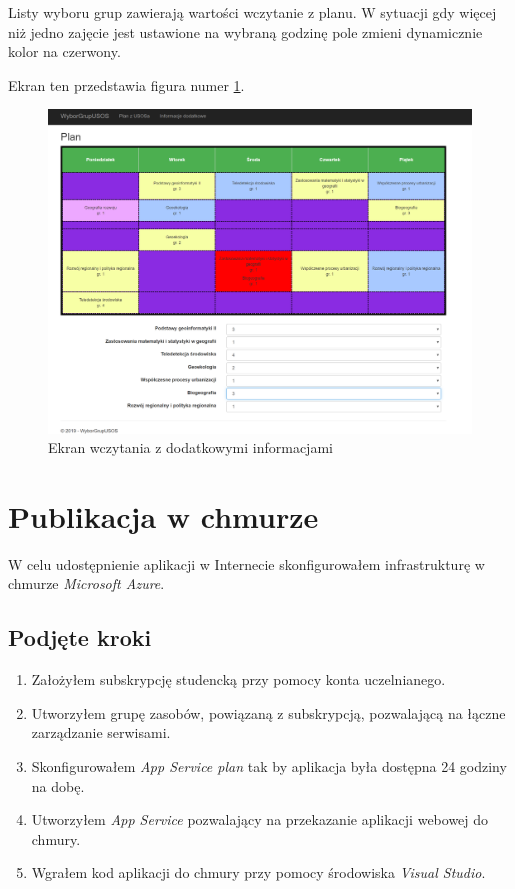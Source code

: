 \documentclass{mwart}
\begin{document}
Listy wyboru grup zawierają wartości wczytanie z planu. W sytuacji gdy więcej niż jedno zajęcie jest ustawione na wybraną godzinę pole zmieni dynamicznie kolor na czerwony.

Ekran ten przedstawia figura numer \ref{fig:ekranPlanu1}.

\begin{figure}[h]
    \centering
    \includegraphics[width=13cm]{Wczytany_plan1.png}
    \caption{Ekran wczytania z dodatkowymi informacjami}
    \label{fig:ekranPlanu1}
\end{figure}


\section{Publikacja w chmurze} \label{sec:chmura}
W celu udostępnienie aplikacji w Internecie skonfigurowałem infrastrukturę w chmurze \textit{Microsoft Azure}.

\subsection{Podjęte kroki}
\begin{enumerate}
\item Założyłem subskrypcję studencką przy pomocy konta uczelnianego.
\item Utworzyłem grupę zasobów, powiązaną z subskrypcją, pozwalającą na łączne zarządzanie serwisami.
\item Skonfigurowałem \textit{App Service plan} tak by aplikacja była dostępna 24 godziny na dobę.
\item Utworzyłem \textit{App Service} pozwalający na przekazanie aplikacji webowej do chmury.
\item Wgrałem kod aplikacji do chmury przy pomocy środowiska \textit{Visual Studio}.
\end{enumerate}
\end{document}
